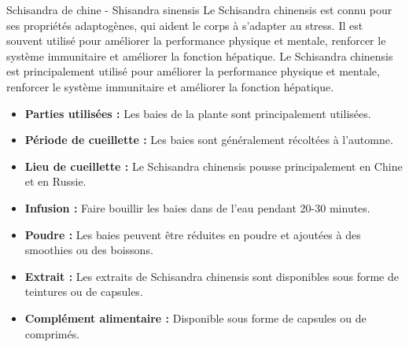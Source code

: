 \ficheidentiteplante
{Schisandra de chine - Shisandra sinensis}
{%
   }
{%
    Le Schisandra chinensis est connu pour ses propriétés adaptogènes, qui aident le corps à s'adapter au stress. Il est souvent utilisé pour améliorer la performance physique et mentale, renforcer le système immunitaire et améliorer la fonction hépatique.
	Le Schisandra chinensis est principalement utilisé pour améliorer la performance physique et mentale, renforcer le système immunitaire et améliorer la fonction hépatique.
 }
{%
    \begin{itemize}[label = \bcplume]
		\item \textbf{Parties utilisées :} Les baies de la plante sont principalement utilisées.
		\item \textbf{Période de cueillette :} Les baies sont généralement récoltées à l'automne.
		\item \textbf{Lieu de cueillette :} Le Schisandra chinensis pousse principalement en Chine et en Russie.
	\end{itemize}
    }

{%
	\begin{itemize}
		\item \textbf{Infusion :} Faire bouillir les baies dans de l'eau pendant 20-30 minutes.
		\item \textbf{Poudre :} Les baies peuvent être réduites en poudre et ajoutées à des smoothies ou des boissons.
		\item \textbf{Extrait :} Les extraits de Schisandra chinensis sont disponibles sous forme de teintures ou de capsules.
		\item \textbf{Complément alimentaire :} Disponible sous forme de capsules ou de comprimés.
	\end{itemize}
}

{%
\begin{multicols}{2}


    \columnbreak


\end{multicols}
}

